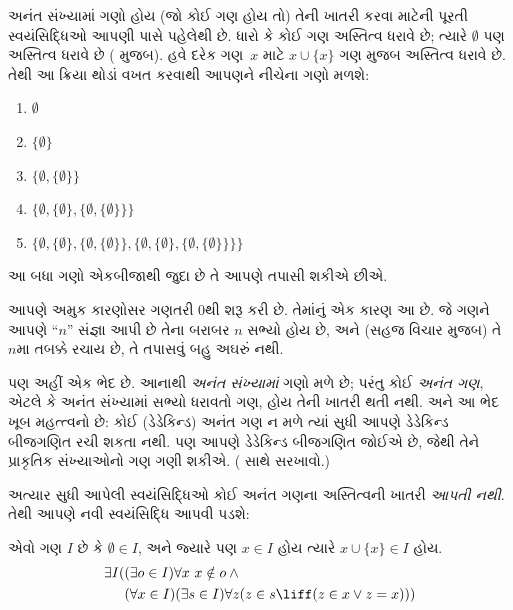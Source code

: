 અનંત સંખ્યામાં ગણો હોય (જો કોઈ ગણ હોય તો) તેની ખાતરી કરવા માટેની
પૂરતી સ્વયંસિદ્ધિઓ આપણી પાસે પહેલેથી છે. ધારો કે કોઈ ગણ અસ્તિત્વ
ધરાવે છે; ત્યારે $\emptyset$ પણ અસ્તિત્વ ધરાવે છે
( મુજબ). હવે દરેક ગણ~$x$ માટે
$x \cup \{x\}$ ગણ  મુજબ
અસ્તિત્વ ધરાવે છે. તેથી આ ક્રિયા થોડાં વખત કરવાથી આપણને નીચેના ગણો
મળશે:
\begin{enumerate}
	\item[0.] $\emptyset$ %
	\item[1.] $ \{\emptyset\}$ %
	\item[2.] $\{\emptyset, \{\emptyset\}\}$ %
	\item[3.] $\{\emptyset, \{\emptyset\}, \{\emptyset, \{\emptyset\}\}\}$ %
	\item[4.] $\{\emptyset, \{\emptyset\}, \{\emptyset, \{\emptyset\}\}, \{\emptyset, \{\emptyset\}, \{\emptyset, \{\emptyset\}\}\}\}$%
\end{enumerate}
આ બધા ગણો એકબીજાથી જુદા છે તે આપણે તપાસી શકીએ છીએ.

આપણે અમુક કારણોસર ગણતરી $0$થી શરૂ કરી છે. તેમાંનું એક કારણ આ છે.
જે ગણને આપણે “$n$” સંજ્ઞા આપી છે તેના બરાબર $n$ સભ્યો હોય છે,
અને (સહજ વિચાર મુજબ) તે $n$મા તબક્કે રચાય છે, તે તપાસવું બહુ અઘરું
નથી.

પણ અહીં એક ભેદ છે. આનાથી \emph{અનંત સંખ્યામાં} ગણો મળે છે; પરંતુ
કોઈ \emph{અનંત ગણ}, એટલે કે અનંત સંખ્યામાં સભ્યો ધરાવતો ગણ, હોય
તેની ખાતરી થતી નથી. અને આ ભેદ ખૂબ મહત્ત્વનો છે: કોઈ
(ડેડેકિન્ડ) અનંત ગણ ન મળે ત્યાં સુધી આપણે ડેડેકિન્ડ બીજગણિત રચી
શકતા નથી. પણ આપણે ડેડેકિન્ડ બીજગણિત જોઈએ છે, જેથી તેને પ્રાકૃતિક
સંખ્યાઓનો ગણ ગણી શકીએ.
( સાથે સરખાવો.)

અત્યાર સુધી આપેલી સ્વયંસિદ્ધિઓ કોઈ અનંત ગણના અસ્તિત્વની ખાતરી
\emph{આપતી નથી}. તેથી આપણે નવી સ્વયંસિદ્ધિ આપવી પડશે:

\begin{axiom}[અનંતતા]
એવો ગણ $I$ છે કે $\emptyset \in I$, અને જ્યારે પણ $x \in I$ હોય
ત્યારે $x \cup \{x\} \in I$ હોય.
\begin{align*}
	\exists I( & (\exists o \in I)\forall x\ x \notin o \land {}\\
	& (\forall x \in I)(\exists s \in I)\forall z(z \in s \liff (z \in x \lor z = x)))
\end{align*}
\end{axiom}

